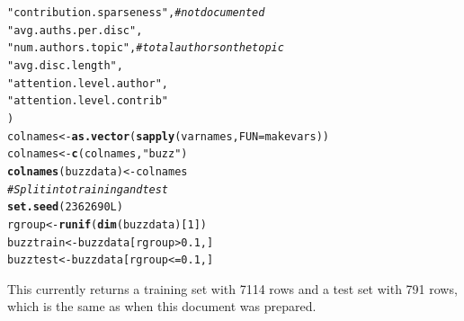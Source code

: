 \documentclass{article}\usepackage[]{graphicx}\usepackage[]{color}
\makeatletter
\newcommand{\hlnum}[1]{\textcolor[rgb]{0.686,0.059,0.569}{#1}}%
\newcommand{\hlstr}[1]{\textcolor[rgb]{0.192,0.494,0.8}{#1}}%
\newcommand{\hlcom}[1]{\textcolor[rgb]{0.678,0.584,0.686}{\textit{#1}}}%
\newcommand{\hlopt}[1]{\textcolor[rgb]{0,0,0}{#1}}%
\newcommand{\hlstd}[1]{\textcolor[rgb]{0.345,0.345,0.345}{#1}}%
\newcommand{\hlkwb}[1]{\textcolor[rgb]{0.69,0.353,0.396}{#1}}%
\newcommand{\hlkwc}[1]{\textcolor[rgb]{0.333,0.667,0.333}{#1}}%
\newcommand{\hlkwd}[1]{\textcolor[rgb]{0.737,0.353,0.396}{\textbf{#1}}}%
\newenvironment{kframe}{%
 \def\at@end@of@kframe{}%
 \ifinner\ifhmode%
  \def\at@end@of@kframe{\end{minipage}}%
  \begin{minipage}{\columnwidth}%
 \fi\fi%
 \def\FrameCommand##1{\hskip\@totalleftmargin \hskip-\fboxsep
 \colorbox{shadecolor}{##1}\hskip-\fboxsep
     \hskip-\linewidth \hskip-\@totalleftmargin \hskip\columnwidth}%
 \MakeFramed {\advance\hsize-\width
   \@totalleftmargin\z@ \linewidth\hsize
   \@setminipage}}%
 {\par\unskip\endMakeFramed%
 \at@end@of@kframe}
\newenvironment{knitrout}{}{} %
\makeatother
\begin{document}
\begin{knitrout}
\begin{kframe}
\begin{alltt}
             \hlstr{"contribution.sparseness"}\hlstd{,} \hlcom{# not documented}
             \hlstr{"avg.auths.per.disc"}\hlstd{,}
             \hlstr{"num.authors.topic"}\hlstd{,} \hlcom{# total authors on the topic}
             \hlstr{"avg.disc.length"}\hlstd{,}
             \hlstr{"attention.level.author"}\hlstd{,}
             \hlstr{"attention.level.contrib"}
\hlstd{)}
\hlstd{colnames} \hlkwb{<-} \hlkwd{as.vector}\hlstd{(}\hlkwd{sapply}\hlstd{(varnames,} \hlkwc{FUN}\hlstd{=makevars))}
\hlstd{colnames} \hlkwb{<-}  \hlkwd{c}\hlstd{(colnames,} \hlstr{"buzz"}\hlstd{)}
\hlkwd{colnames}\hlstd{(buzzdata)} \hlkwb{<-} \hlstd{colnames}
\hlcom{# Split into training and test}
\hlkwd{set.seed}\hlstd{(}\hlnum{2362690L}\hlstd{)}
\hlstd{rgroup} \hlkwb{<-} \hlkwd{runif}\hlstd{(}\hlkwd{dim}\hlstd{(buzzdata)[}\hlnum{1}\hlstd{])}
\hlstd{buzztrain} \hlkwb{<-} \hlstd{buzzdata[rgroup} \hlopt{>} \hlnum{0.1}\hlstd{,]}
\hlstd{buzztest} \hlkwb{<-} \hlstd{buzzdata[rgroup} \hlopt{<=}\hlnum{0.1}\hlstd{,]}
\end{alltt}
\end{kframe}
\end{knitrout}


This currently returns a training set with 7114 rows and a test set with 
791 rows, which 
is the same
as when this document was prepared.
\end{document}

